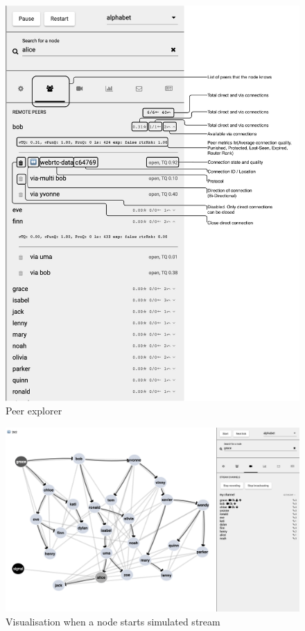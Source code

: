 \begin{figure}
\centering
\includegraphics[width=1\textwidth]{graphics/analysis-tools/visualisation-sidebar-peer-explorer.pdf}
\caption{Peer explorer}
\label{fig:anl-sim-peer-explorer}
\end{figure}

\begin{figure}
\centering
\vspace{15.2cm}
\includegraphics[width=1\textwidth]{graphics/analysis-tools/visualisation-stream-overlay.jpg}
\caption{Visualisation when a node starts simulated stream}
\label{fig:anl-sim-stream-active}
\end{figure}

